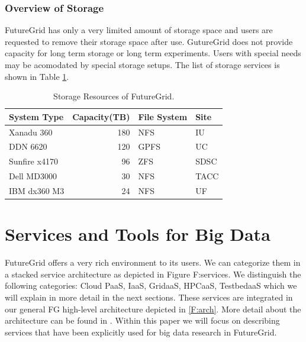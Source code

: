 \documentclass{article}
\begin{document}
\subsubsection{Overview of Storage}

FutureGrid has only a very limited amount of storage space and users
are requested to remove their storage space after use. GutureGrid does
not provide capacity for long term storage or long term
experiments. Users with special needs may be acomodated by special
storage setups. The list of storage services is shown in Table \ref{T:storage}.

\begin{table}[htb]
\caption{Storage Resources of FutureGrid.}
\label{T:storage} 

\centering{}%
\begin{tabular}{lrll}
\textbf{System Type } & \textbf{Capacity(TB) } & \textbf{File System } & \textbf{Site }\tabularnewline
\hline 
Xanadu 360  & 180  & NFS  & IU \tabularnewline
DDN 6620  & 120  & GPFS  & UC \tabularnewline
Sunfire x4170  & 96  & ZFS  & SDSC \tabularnewline
Dell MD3000  & 30  & NFS  & TACC \tabularnewline
IBM dx360 M3  & 24  & NFS  & UF \tabularnewline
\end{tabular}
\end{table}



\section{Services and Tools for Big Data}

FutureGrid offers a very rich environment to its users. We can categorize them in a stacked service architecture as depicted in 
Figure {F:services}. We distinguish the following categories: Cloud PaaS, IaaS, GridaaS, HPCaaS, TestbedaaS which we will explain in more detail in the next sections. These services are integrated in our general FG high-level architecture depicted in \ref{F:arch}. More detail about the architecture can be found in \cite{las2010gce,las12fg-bookchapter}. Within this paper we will focus on describing services that have been explicitly used for big data research in FutureGrid.
\end{document}
